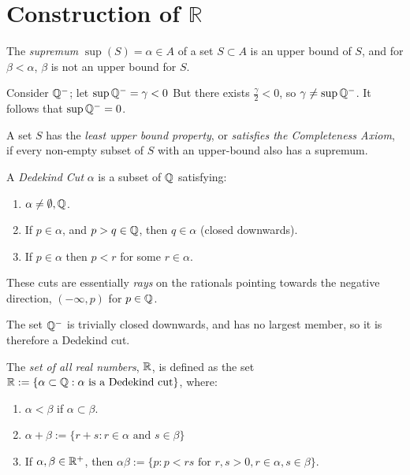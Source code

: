 \section{Construction of $\mathbb{R}$}
\begin{definition}
	The \emph{supremum} $\sup(S)=\alpha\in A$ of a set $S \subset A$ is an upper bound of $S$, and for $\beta < \alpha$, $\beta$ is not an upper bound for $S$.
\end{definition}
\begin{eg}
	Consider $\mathbb{Q}^-$; let $\sup\mathbb{Q}^-=\gamma < 0$ But there exists $ \frac{\gamma}{2}<0$, so $\gamma\neq\sup\mathbb{Q}^-$. It follows that $\sup\mathbb{Q}^-=0$.
\end{eg}
\begin{definition}
    A set $S$ has the \emph{least upper bound property}, or \emph{satisfies the Completeness Axiom}, if every non-empty subset of $S$ with an upper-bound also has a supremum.
\end{definition}
\begin{definition}
	A \emph{Dedekind Cut} $\alpha$ is a subset of $\mathbb{Q}$ satisfying:
    \begin{enumerate}
        \item $\alpha \neq \emptyset,\mathbb{Q}$.
        \item If $p\in\alpha$, and $p>q\in \mathbb{Q}$, then $q\in \alpha$ (closed downwards).
        \item If $p\in \alpha$ then $p<r$ for some $r\in\alpha$.
    \end{enumerate}
\end{definition}
These cuts are essentially \emph{rays} on the rationals pointing towards the negative direction, $(-\infty, p)$ for $p\in \mathbb{Q}$.
\begin{eg}
	The set $\mathbb{Q}^-$ is trivially closed downwards, and has no largest member, so it is therefore a Dedekind cut.
\end{eg}
\begin{definition}
	The \emph{set of all real numbers}, $\mathbb{R}$, is defined as the set $\mathbb{R}:=\{\alpha \subset \mathbb{Q}:\alpha \text{ is a Dedekind cut}\}$, where:
    \begin{enumerate}
        \item $\alpha < \beta$ if $\alpha \subset \beta$.
        \item $\alpha + \beta := \{r+s: r\in\alpha \text{ and } s\in\beta\}$
        \item If $\alpha, \beta \in \mathbb{R}^+$, then $\alpha\beta := \{p:p<rs \text{ for } r,s>0, r\in\alpha, s\in\beta\}$.
    \end{enumerate}
\end{definition}
